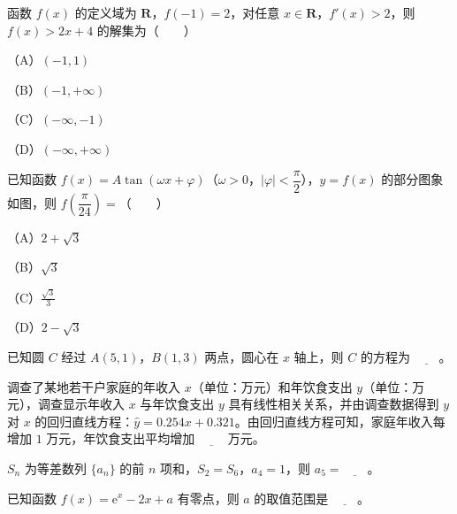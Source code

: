 \begin{question}
函数 $f(x)$ 的定义域为 $\mathbf R$，$f(-1)=2$，对任意 $x\in\mathbf R$，$f'(x)>2$，则 $f(x)>2x+4$ 的解集为\mbox{（　　）}

（A）$(-1,1)$

（B）$(-1,+\infty)$

（C）$(-\infty,-1)$

（D）$(-\infty,+\infty)$

\Needspace{0.4\textheight}
\end{question}
\begin{question}
已知函数 $f(x)=A\tan(\omega x+\varphi)$（$\omega>0$，$|\varphi|<\dfrac\pi2$），$y=f(x)$ 的部分图象如图，则 $f\left(\dfrac\pi{24}\right)=$\mbox{（　　）}

（A）$2+\sqrt3$

（B）$\sqrt3$

（C）$\frac{\sqrt3}3$

（D）$2-\sqrt3$
\nopagebreak[4]
\begin{center}\end{center}
\nopagebreak[4]
\end{question}

\begin{question}
已知圆 $C$ 经过 $A(5,1)$，$B(1,3)$ 两点，圆心在 $x$ 轴上，则 $C$ 的方程为 $\underline{\qquad}$。

\end{question}
\begin{question}
调查了某地若干户家庭的年收入 $x$（单位：万元）和年饮食支出 $y$（单位：万元），调查显示年收入 $x$ 与年饮食支出 $y$ 具有线性相关关系，并由调查数据得到 $y$ 对 $x$ 的回归直线方程：$\hat y=0.254x+0.321$。由回归直线方程可知，家庭年收入每增加 $1$ 万元，年饮食支出平均增加 $\underline{\qquad}$ 万元。

\end{question}
\begin{question}
$S_n$ 为等差数列 $\{a_n\}$ 的前 $n$ 项和，$S_2=S_6$，$a_4=1$，则 $a_5=\underline{\qquad}$。

\end{question}
\begin{question}
已知函数 $f(x)=\mathrm e^x-2x+a$ 有零点，则 $a$ 的取值范围是 $\underline{\qquad}$。

\end{question}

